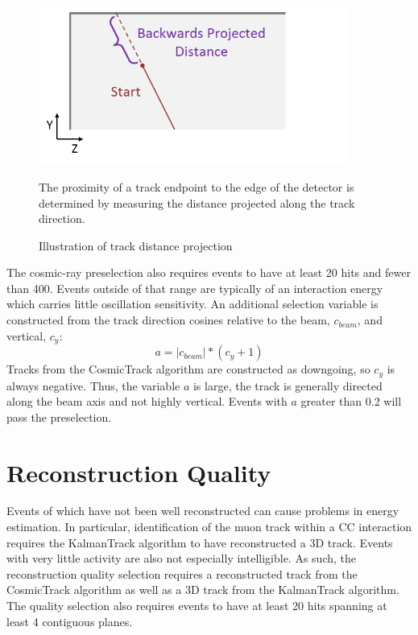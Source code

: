 \begin{figure}
\begin{center}
\includegraphics[width=0.9\textwidth]{figures/selection/backdist.png}
\end{center}
\caption{Illustration of track distance projection}{
The proximity of a track endpoint to the edge of the detector is determined
by measuring the distance projected along the track direction.
}
\label{trackproj}
\end{figure}

The cosmic-ray preselection also requires events to have at least 20 hits
and fewer than 400.  Events outside of that range are typically of an
interaction energy which carries little oscillation sensitivity.  An additional
selection variable is constructed from the track direction cosines relative to
the beam, $c_{beam}$, and vertical, $c_y$:
\begin{equation}
a = |c_{beam}| * (c_y + 1)
\end{equation}
Tracks from the CosmicTrack algorithm are constructed as downgoing, so $c_y$ is
always negative.  Thus, the variable $a$ is large, the track is generally
directed along the beam axis and not highly vertical.
Events with $a$ greater than 0.2 will pass the preselection.

\section{Reconstruction Quality}

Events of which have not been well reconstructed can cause problems
in energy estimation.
In particular, identification of the muon track within a \numu CC interaction requires the KalmanTrack algorithm to have reconstructed a 3D track.
Events with very little activity are also not especially intelligible.
As such, the reconstruction quality selection requires a reconstructed track
from the CosmicTrack algorithm as well as a 3D track from the KalmanTrack
algorithm.
The quality selection also requires events to have at least 20 hits
spanning at least 4 contiguous planes.

